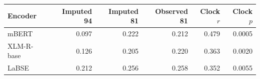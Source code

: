 \begin{tabular}{lrrrrr}
\toprule
Encoder & Imputed 94 & Imputed 81 & Observed 81 & Clock $r$ & Clock $p$ \\
\midrule
mBERT & 0.097 & 0.222 & 0.212 & 0.479 & 0.0005 \\
XLM-R-base & 0.126 & 0.205 & 0.220 & 0.363 & 0.0020 \\
LaBSE & 0.212 & 0.256 & 0.258 & 0.352 & 0.0055 \\
\bottomrule
\end{tabular}
